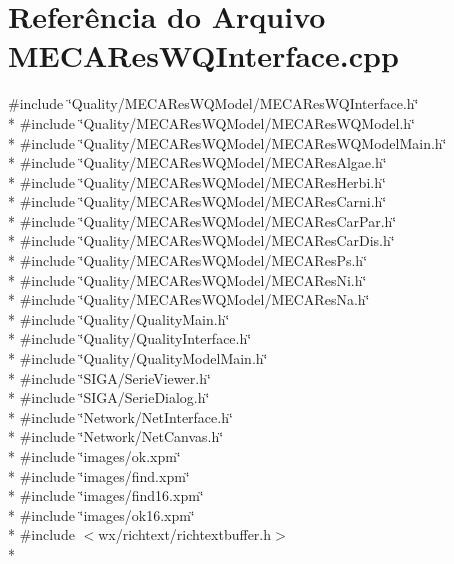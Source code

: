 \section{Referência do Arquivo M\+E\+C\+A\+Res\+W\+Q\+Interface.\+cpp}
\label{_m_e_c_a_res_w_q_interface_8cpp}
{\ttfamily \#include \char`\"{}Quality/\+M\+E\+C\+A\+Res\+W\+Q\+Model/\+M\+E\+C\+A\+Res\+W\+Q\+Interface.\+h\char`\"{}}\\*
{\ttfamily \#include \char`\"{}Quality/\+M\+E\+C\+A\+Res\+W\+Q\+Model/\+M\+E\+C\+A\+Res\+W\+Q\+Model.\+h\char`\"{}}\\*
{\ttfamily \#include \char`\"{}Quality/\+M\+E\+C\+A\+Res\+W\+Q\+Model/\+M\+E\+C\+A\+Res\+W\+Q\+Model\+Main.\+h\char`\"{}}\\*
{\ttfamily \#include \char`\"{}Quality/\+M\+E\+C\+A\+Res\+W\+Q\+Model/\+M\+E\+C\+A\+Res\+Algae.\+h\char`\"{}}\\*
{\ttfamily \#include \char`\"{}Quality/\+M\+E\+C\+A\+Res\+W\+Q\+Model/\+M\+E\+C\+A\+Res\+Herbi.\+h\char`\"{}}\\*
{\ttfamily \#include \char`\"{}Quality/\+M\+E\+C\+A\+Res\+W\+Q\+Model/\+M\+E\+C\+A\+Res\+Carni.\+h\char`\"{}}\\*
{\ttfamily \#include \char`\"{}Quality/\+M\+E\+C\+A\+Res\+W\+Q\+Model/\+M\+E\+C\+A\+Res\+Car\+Par.\+h\char`\"{}}\\*
{\ttfamily \#include \char`\"{}Quality/\+M\+E\+C\+A\+Res\+W\+Q\+Model/\+M\+E\+C\+A\+Res\+Car\+Dis.\+h\char`\"{}}\\*
{\ttfamily \#include \char`\"{}Quality/\+M\+E\+C\+A\+Res\+W\+Q\+Model/\+M\+E\+C\+A\+Res\+Ps.\+h\char`\"{}}\\*
{\ttfamily \#include \char`\"{}Quality/\+M\+E\+C\+A\+Res\+W\+Q\+Model/\+M\+E\+C\+A\+Res\+Ni.\+h\char`\"{}}\\*
{\ttfamily \#include \char`\"{}Quality/\+M\+E\+C\+A\+Res\+W\+Q\+Model/\+M\+E\+C\+A\+Res\+Na.\+h\char`\"{}}\\*
{\ttfamily \#include \char`\"{}Quality/\+Quality\+Main.\+h\char`\"{}}\\*
{\ttfamily \#include \char`\"{}Quality/\+Quality\+Interface.\+h\char`\"{}}\\*
{\ttfamily \#include \char`\"{}Quality/\+Quality\+Model\+Main.\+h\char`\"{}}\\*
{\ttfamily \#include \char`\"{}S\+I\+G\+A/\+Serie\+Viewer.\+h\char`\"{}}\\*
{\ttfamily \#include \char`\"{}S\+I\+G\+A/\+Serie\+Dialog.\+h\char`\"{}}\\*
{\ttfamily \#include \char`\"{}Network/\+Net\+Interface.\+h\char`\"{}}\\*
{\ttfamily \#include \char`\"{}Network/\+Net\+Canvas.\+h\char`\"{}}\\*
{\ttfamily \#include \char`\"{}images/ok.\+xpm\char`\"{}}\\*
{\ttfamily \#include \char`\"{}images/find.\+xpm\char`\"{}}\\*
{\ttfamily \#include \char`\"{}images/find16.\+xpm\char`\"{}}\\*
{\ttfamily \#include \char`\"{}images/ok16.\+xpm\char`\"{}}\\*
{\ttfamily \#include $<$wx/richtext/richtextbuffer.\+h$>$}\\*

